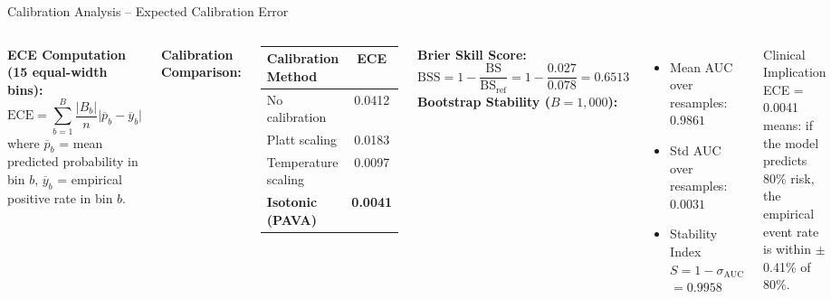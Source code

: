 \documentclass[aspectratio=169]{beamer}
\begin{document}
\begin{frame}{Calibration Analysis -- Expected Calibration Error}
  \begin{columns}[T]
      \textbf{ECE Computation (15 equal-width bins):}
      \small
      \[
        \mathrm{ECE} = \sum_{b=1}^{B} \frac{|B_b|}{n}
        \bigl|\overline{p}_b - \overline{y}_b\bigr|
      \]
      where $\overline{p}_b$ = mean predicted probability in bin $b$,
      $\overline{y}_b$ = empirical positive rate in bin $b$.
      \vspace{0.3em}

      \textbf{Calibration Comparison:}
      \begin{center}\small
      \begin{tabular}{@{}lc@{}}
        \toprule
        \textbf{Calibration Method} & \textbf{ECE} \\
        \midrule
        No calibration          & 0.0412 \\
        Platt scaling           & 0.0183 \\
        Temperature scaling     & 0.0097 \\
        \textbf{Isotonic (PAVA)} & \textbf{0.0041} \\
        \bottomrule
      \end{tabular}
      \end{center}
      \textbf{Brier Skill Score:}
      \[
        \mathrm{BSS} = 1 - \frac{\mathrm{BS}}{\mathrm{BS}_\text{ref}}
        = 1 - \frac{0.027}{0.078} = 0.6513
      \]
      \vspace{0.2em}
      \textbf{Bootstrap Stability ($B=1{,}000$):}
      \begin{itemize}\small
        \item Mean AUC over resamples: $0.9861$
        \item Std AUC over resamples: $0.0031$
        \item Stability Index $S = 1 - \sigma_\text{AUC}$
              $= 0.9958$
      \end{itemize}
      \begin{block}{Clinical Implication}
        ECE = 0.0041 means: if the model predicts 80\% risk,
        the empirical event rate is within $\pm$0.41\% of 80\%.
      \end{block}
  \end{columns}
\end{frame}
\end{document}
